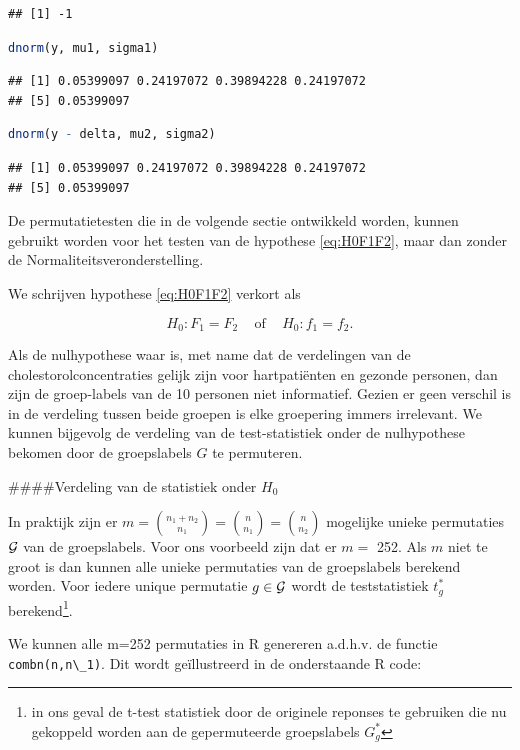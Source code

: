 \documentclass[
  12pt,dutch,coursenotes]{book}
\newcommand{\passthrough}[1]{#1}
\begin{document}
\begin{lstlisting}
## [1] -1
\end{lstlisting}

\begin{lstlisting}[language=R]
dnorm(y, mu1, sigma1)
\end{lstlisting}

\begin{lstlisting}
## [1] 0.05399097 0.24197072 0.39894228 0.24197072
## [5] 0.05399097
\end{lstlisting}

\begin{lstlisting}[language=R]
dnorm(y - delta, mu2, sigma2)
\end{lstlisting}

\begin{lstlisting}
## [1] 0.05399097 0.24197072 0.39894228 0.24197072
## [5] 0.05399097
\end{lstlisting}

De permutatietesten die in de volgende sectie ontwikkeld worden, kunnen gebruikt worden voor het testen van de hypothese \eqref{eq:H0F1F2}, maar dan zonder de Normaliteitsveronderstelling.

We schrijven hypothese \eqref{eq:H0F1F2} verkort als

\[
  H_0: F_1=F_2 \;\;\;\text{ of }\;\;\; H_0:f_1=f_2.
\]

Als de nulhypothese waar is, met name dat de verdelingen van de cholestorolconcentraties gelijk zijn voor hartpatiënten en gezonde personen, dan zijn de groep-labels van de 10 personen niet informatief.
Gezien er geen verschil is in de verdeling tussen beide groepen is elke groepering immers irrelevant.
We kunnen bijgevolg de verdeling van de test-statistiek onder de nulhypothese bekomen door de groepslabels \(G\) te permuteren.

\#\#\#\#Verdeling van de statistiek onder \(H_0\)

In praktijk zijn er \(m=\binom{n_1+n_2}{n_1}=\binom{n}{n_1}=\binom{n}{n_2}\) mogelijke unieke permutaties \(\cal{G}\) van de groepslabels.
Voor ons voorbeeld zijn dat er \(m=\) 252.
Als \(m\) niet te groot is dan kunnen alle unieke permutaties van de groepslabels berekend worden.
Voor iedere unique permutatie \(g \in \cal{G}\) wordt de teststatistiek \(t^*_g\) berekend\footnote{in ons geval de t-test statistiek door de originele reponses te gebruiken die nu gekoppeld worden aan de gepermuteerde groepslabels \(G_g^*\)}.

We kunnen alle m=252 permutaties in R genereren a.d.h.v. de functie \passthrough{\lstinline!combn(n,n\_1)!}.
Dit wordt geïllustreerd in de onderstaande R code:
\end{document}
